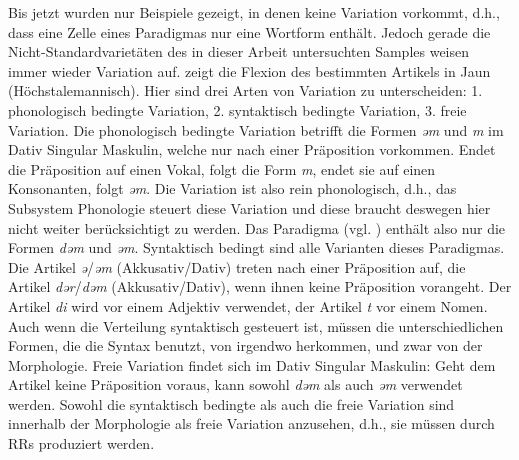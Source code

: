  Bis jetzt wurden nur Beispiele gezeigt, in denen keine Variation vorkommt, d.h., dass eine Zelle eines Paradigmas nur eine Wortform enthält. Jedoch gerade die Nicht-Stan\-dard\-va\-ri\-e\-tä\-ten des in dieser Arbeit untersuchten Samples weisen immer wieder Variation auf.  zeigt die Flexion des bestimmten Artikels in Jaun (Höchstalemannisch). Hier sind drei Arten von Variation zu unterscheiden: 1. phonologisch bedingte Variation, 2. syntaktisch bedingte Variation, 3. freie Variation. Die phonologisch bedingte Variation betrifft die Formen \textit{əm} und \textit{m} im Dativ Singular Maskulin, welche nur nach einer Präposition vorkommen. Endet die Präposition auf einen Vokal, folgt die Form \textit{m}, endet sie auf einen Konsonanten, folgt \textit{əm}. Die Variation ist also rein phonologisch, d.h., das Subsystem Phonologie steuert diese Variation und diese braucht deswegen hier nicht weiter berücksichtigt zu werden. Das Paradigma (vgl. ) enthält also nur die Formen \textit{dəm} und \textit{əm}. Syntaktisch bedingt sind alle Varianten dieses Paradigmas. Die Artikel \textit{ə}\slash\textit{əm} (Akkusativ/Dativ) treten nach einer Präposition auf, die Artikel \textit{dər}\slash\textit{dəm} (Akkusativ/Dativ), wenn ihnen keine Präposition vorangeht. Der Artikel \textit{di} wird vor einem Adjektiv verwendet, der Artikel \textit{t} vor einem Nomen. Auch wenn die Verteilung syntaktisch gesteuert ist, müssen die unterschiedlichen Formen, die die Syntax benutzt, von irgendwo herkommen, und zwar von der Morphologie. Freie Variation findet sich im Dativ Singular Maskulin: Geht dem Artikel keine Präposition voraus, kann sowohl \textit{dəm} als auch \textit{əm} verwendet werden. Sowohl die syntaktisch bedingte als auch die freie Variation sind innerhalb der Morphologie als freie Variation anzusehen, d.h., sie müssen durch RRs produziert werden.

